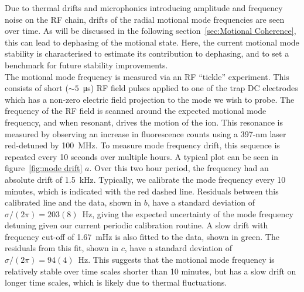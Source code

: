     Due to thermal drifts and microphonics introducing amplitude and frequency noise on the RF chain, drifts of the radial motional mode frequencies are seen over time. As will be discussed in the following section~\ref{sec:Motional Coherence}, this can lead to dephasing of the motional state. Here, the current motional mode stability is characterised to estimate its contribution to dephasing, and to set a benchmark for future stability improvements. \\
    The motional mode frequency is measured via an RF ``tickle'' experiment. This consists of short ($\sim 5$~\unit{\us}) RF field pulses applied to one of the trap DC electrodes which has a non-zero electric field projection to the mode we wish to probe. The frequency of the RF field is scanned around the expected motional mode frequency, and when resonant, drives the motion of the ion. This resonance is measured by observing an increase in fluorescence counts using a 397-nm laser red-detuned by 100~\unit{\MHz}. To measure mode frequency drift, this sequence is repeated every 10 seconds over multiple hours. A typical plot can be seen in figure~\ref{fig:mode drift} $a$. Over this two hour period, the frequency had an absolute drift of 1.5~\unit{\kHz}. Typically, we calibrate the mode frequency every 10 minutes, which is indicated with the red dashed line. Residuals between this calibrated line and the data, shown in $b$, have a standard deviation of $\sigma/(2\pi) = 203(8)$~\unit{\Hz}, giving the expected uncertainty of the mode frequency detuning given our current periodic calibration routine. A slow drift with frequency cut-off of 1.67~\unit{\mHz} is also fitted to the data, shown in green. The residuals from this fit, shown in $c$, have a standard deviation of $\sigma/(2\pi) = 94(4)$~\unit{\Hz}. This suggests that the motional mode frequency is relatively stable over time scales shorter than 10 minutes, but has a slow drift on longer time scales, which is likely due to thermal fluctuations. \\
    
    

